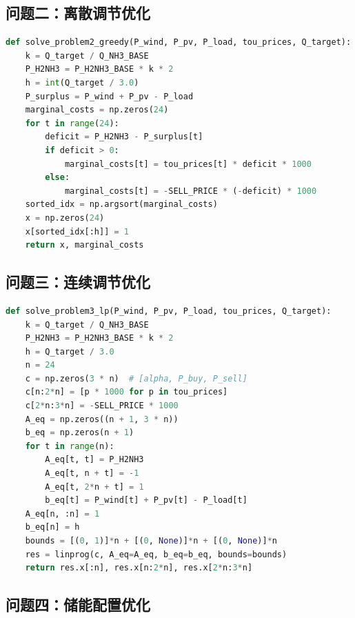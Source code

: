 \subsection{问题二：离散调节优化}

\begin{lstlisting}[language=Python, basicstyle=\ttfamily\footnotesize, breaklines=true]
def solve_problem2_greedy(P_wind, P_pv, P_load, tou_prices, Q_target):
    k = Q_target / Q_NH3_BASE
    P_H2NH3 = P_H2NH3_BASE * k * 2
    h = int(Q_target / 3.0)
    P_surplus = P_wind + P_pv - P_load
    marginal_costs = np.zeros(24)
    for t in range(24):
        deficit = P_H2NH3 - P_surplus[t]
        if deficit > 0:
            marginal_costs[t] = tou_prices[t] * deficit * 1000
        else:
            marginal_costs[t] = -SELL_PRICE * (-deficit) * 1000
    sorted_idx = np.argsort(marginal_costs)
    x = np.zeros(24)
    x[sorted_idx[:h]] = 1
    return x, marginal_costs
\end{lstlisting}

\subsection{问题三：连续调节优化}

\begin{lstlisting}[language=Python, basicstyle=\ttfamily\footnotesize, breaklines=true]
def solve_problem3_lp(P_wind, P_pv, P_load, tou_prices, Q_target):
    k = Q_target / Q_NH3_BASE
    P_H2NH3 = P_H2NH3_BASE * k * 2
    h = Q_target / 3.0
    n = 24
    c = np.zeros(3 * n)  # [alpha, P_buy, P_sell]
    c[n:2*n] = [p * 1000 for p in tou_prices]
    c[2*n:3*n] = -SELL_PRICE * 1000
    A_eq = np.zeros((n + 1, 3 * n))
    b_eq = np.zeros(n + 1)
    for t in range(n):
        A_eq[t, t] = P_H2NH3
        A_eq[t, n + t] = -1
        A_eq[t, 2*n + t] = 1
        b_eq[t] = P_wind[t] + P_pv[t] - P_load[t]
    A_eq[n, :n] = 1
    b_eq[n] = h
    bounds = [(0, 1)]*n + [(0, None)]*n + [(0, None)]*n
    res = linprog(c, A_eq=A_eq, b_eq=b_eq, bounds=bounds)
    return res.x[:n], res.x[n:2*n], res.x[2*n:3*n]
\end{lstlisting}

\subsection{问题四：储能配置优化}

